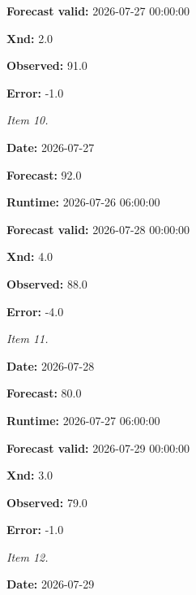 \documentclass[11pt]{article}
\begin{document}
\par\noindent\textbf{Forecast valid:} 2026-07-27 00:00:00

\par\noindent\textbf{Xnd:} 2.0

\par\noindent\textbf{Observed:} 91.0

\par\noindent\textbf{Error:} -1.0

\par\noindent\textit{Item 10.}\par \par\noindent\textbf{Date:} 2026-07-27

\par\noindent\textbf{Forecast:} 92.0

\par\noindent\textbf{Runtime:} 2026-07-26 06:00:00

\par\noindent\textbf{Forecast valid:} 2026-07-28 00:00:00

\par\noindent\textbf{Xnd:} 4.0

\par\noindent\textbf{Observed:} 88.0

\par\noindent\textbf{Error:} -4.0

\par\noindent\textit{Item 11.}\par \par\noindent\textbf{Date:} 2026-07-28

\par\noindent\textbf{Forecast:} 80.0

\par\noindent\textbf{Runtime:} 2026-07-27 06:00:00

\par\noindent\textbf{Forecast valid:} 2026-07-29 00:00:00

\par\noindent\textbf{Xnd:} 3.0

\par\noindent\textbf{Observed:} 79.0

\par\noindent\textbf{Error:} -1.0

\par\noindent\textit{Item 12.}\par \par\noindent\textbf{Date:} 2026-07-29
\end{document}
